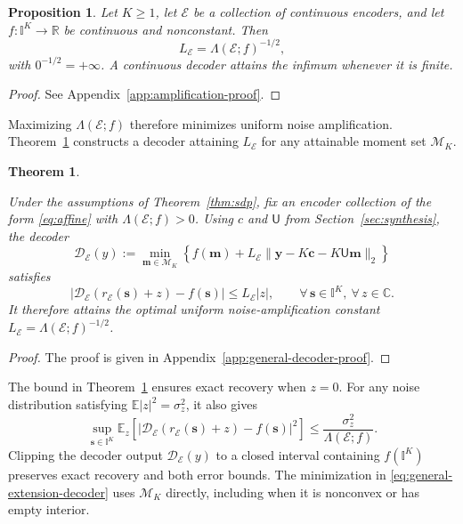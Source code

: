 \documentclass[journal,12pt,onecolumn,draftclsnofoot]{IEEEtran}
\newtheorem{theorem}{Theorem}
\newtheorem{proposition}{Proposition}
\newcommand{\enc}{\mathscr{E}}\newcommand{\dec}{\mathscr{D}}\newcommand{\R}{\mathbb R}\newcommand{\C}{\mathbb C}
\begin{document}




\begin{proposition}\label{prop:amplification}
Let $K\ge1$, let $\enc$ be a collection of continuous encoders, and let $f:\mathbb I^K\to\R$ be continuous and nonconstant. Then
$${ L_\enc}=\Lambda(\enc;f)^{-1/2},$$
with $0^{-1/2}=+\infty$. A continuous decoder attains the infimum whenever it is finite.
\end{proposition}
\begin{proof}
    See Appendix~\ref{app:amplification-proof}.
\end{proof}
Maximizing $\Lambda(\enc;f)$ therefore minimizes uniform noise amplification. Theorem~\ref{thm:decoder} constructs a decoder attaining $L_\enc$ for any attainable moment set $\mathcal M_K$.


\begin{theorem}
\label{thm:decoder}\label{thm:general-decoder}

Under the assumptions of Theorem~\ref{thm:sdp}, fix an encoder collection of the form \eqref{eq:affine} with $\Lambda(\enc;f)>0$.
Using $c$ and $\mathsf U$ from Section~\ref{sec:synthesis}, the decoder
\begin{equation}
\dec_\enc(y):=
\min_{\boldsymbol m\in\mathcal M_K}
\left\{f(\boldsymbol m)
+L_\enc\|\boldsymbol y-K\boldsymbol c-K\mathsf U\boldsymbol m\|_2
\right\}
\label{eq:general-extension-decoder}
\end{equation}
satisfies
$$
|\dec_\enc(r_\enc(\boldsymbol s)+z)-f(\boldsymbol s)|
\le L_\enc|z|,
\qquad
\forall\,\boldsymbol s\in\mathbb I^K,\ \forall\,z\in\C.
$$
It therefore attains the optimal uniform noise-amplification
constant $L_\enc=\Lambda(\enc;f)^{-1/2}$.


\end{theorem}
\begin{proof}
    The proof is given in Appendix~\ref{app:general-decoder-proof}.
\end{proof}


The bound in Theorem~\ref{thm:decoder} ensures exact recovery when $z=0$. For any noise
distribution satisfying $\mathbb E|z|^2=\sigma_z^2$, it also gives
$$
\sup_{\boldsymbol s\in\mathbb I^K}
\mathbb E_z\!\left[
|{ \dec_\enc}(r_\enc(\boldsymbol s)+z)-f(\boldsymbol s)|^2
\right]
\le \frac{\sigma_z^2}{\Lambda(\enc;f)}.
$$
Clipping the decoder output $\dec_\enc(y)$ to a closed interval containing
$f(\mathbb I^K)$ preserves exact recovery and both error bounds.
The minimization in \eqref{eq:general-extension-decoder} uses
$\mathcal M_K$ directly, including when it is nonconvex or has
empty interior.
\end{document}
